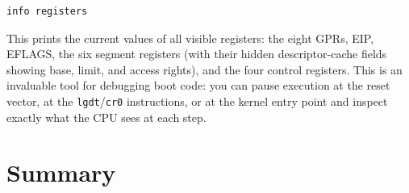 \documentclass[11pt]{article}
\begin{document}
\begin{lstlisting}[caption={QEMU monitor command to display all registers}]
info registers
\end{lstlisting}

This prints the current values of all visible registers: the eight GPRs, EIP, EFLAGS, the
six segment registers (with their hidden descriptor-cache fields showing base, limit, and
access rights), and the four control registers. This is an invaluable tool for debugging
boot code: you can pause execution at the reset vector, at the \texttt{lgdt}/\texttt{cr0}
instructions, or at the kernel entry point and inspect exactly what the CPU sees at each step.

\section{Summary}
\end{document}
